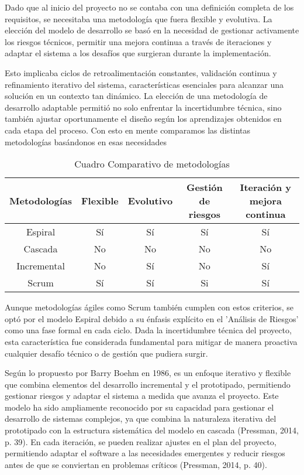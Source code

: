 
Dado que al inicio del proyecto no se contaba con una definición completa de los requisitos, se necesitaba una metodología que fuera flexible y evolutiva. La elección del modelo de desarrollo se basó en la necesidad de gestionar activamente los riesgos técnicos, permitir una mejora continua a través de iteraciones y adaptar el sistema a los desafíos que surgieran durante la implementación.

Esto implicaba ciclos de retroalimentación constantes, validación continua y refinamiento iterativo del sistema, características esenciales para alcanzar una solución en un contexto tan dinámico. La elección de una metodología de desarrollo adaptable permitió no solo enfrentar la incertidumbre técnica, sino también ajustar oportunamente el diseño según los aprendizajes obtenidos en cada etapa del proceso. Con esto en mente comparamos las distintas metodologías basándonos en esas necesidades

\begin{table}[h!]
  \doublespacing
  \centering
  \small
  \begin{tabular}{ c c c c c }
    \hline
    Metodologías & Flexible & Evolutivo & Gestión de riesgos & Iteración y mejora continua \\
    \hline
    Espiral      & Sí       & Sí        & Sí                 & Sí                          \\
    Cascada      & No       & No        & No                 & No                          \\
    Incremental  & No       & Sí        & No                 & Sí                          \\
    Scrum        & Sí       & Sí        & Si                 & Sí                          \\
    \hline
  \end{tabular}
  \caption{Cuadro Comparativo de metodologías}
  \label{tab:comparative-methodologies}
\end{table}

Aunque metodologías ágiles como Scrum también cumplen con estos criterios, se optó por el modelo Espiral debido a su énfasis explícito en el 'Análisis de Riesgos' como una fase formal en cada ciclo. Dada la incertidumbre técnica del proyecto, esta característica fue considerada fundamental para mitigar de manera proactiva cualquier desafío técnico o de gestión que pudiera surgir.

Según lo propuesto por Barry Boehm en 1986, es un enfoque iterativo y flexible que combina elementos del desarrollo incremental y el prototipado, permitiendo gestionar riesgos y adaptar el sistema a medida que avanza el proyecto. Este modelo ha sido ampliamente reconocido por su capacidad para gestionar el desarrollo de sistemas complejos, ya que combina la naturaleza iterativa del prototipado con la estructura sistemática del modelo en cascada (Pressman, 2014, p. 39). En cada iteración, se pueden realizar ajustes en el plan del proyecto, permitiendo adaptar el software a las necesidades emergentes y reducir riesgos antes de que se conviertan en problemas críticos (Pressman, 2014, p. 40).

